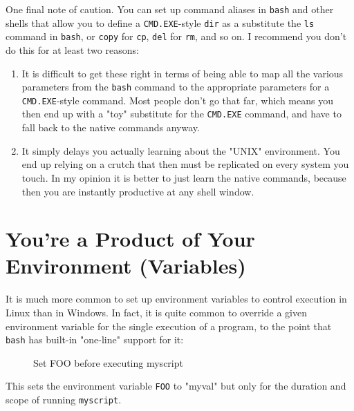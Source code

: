 \documentclass[10pt,american,]{book}
\newenvironment{Shaded}{\begin{snugshade}}{\end{snugshade}}
\newcommand{\KeywordTok}[1]{\textcolor[rgb]{0.13,0.29,0.53}{\textbf{{#1}}}}
\newcommand{\OtherTok}[1]{\textcolor[rgb]{0.56,0.35,0.01}{{#1}}}
\newcommand{\NormalTok}[1]{{#1}}
\numberwithin{figure}{chapter}
\DeclareRobustCommand{\drcap}[1]{\begin{figure}[H]\caption{#1}\end{figure}}
\renewcommand{\KeywordTok}[1]{{#1}}
\renewcommand{\OtherTok}[1]{{#1}}
\renewcommand{\NormalTok}[1]{{#1}}
\begin{document}
One final note of caution. You can set up command aliases in
\texttt{bash} and other shells that allow you to define a
\texttt{CMD.EXE}-style \texttt{dir} as a substitute the \texttt{ls}
command in \texttt{bash}, or \texttt{copy} for \texttt{cp}, \texttt{del}
for \texttt{rm}, and so on. I recommend you don't do this for at least
two reasons:

\begin{enumerate}
\def\labelenumi{\arabic{enumi}.}
\item
  It is difficult to get these right in terms of being able to map all
  the various parameters from the \texttt{bash} command to the
  appropriate parameters for a \texttt{CMD.EXE}-style command. Most
  people don't go that far, which means you then end up with a "toy"
  substitute for the \texttt{CMD.EXE} command, and have to fall back to
  the native commands anyway.
\item
  It simply delays you actually learning about the "UNIX" environment.
  You end up relying on a crutch that then must be replicated on every
  system you touch. In my opinion it is better to just learn the native
  commands, because then you are instantly productive at any shell
  window.
\end{enumerate}

\section*{You're a Product of Your Environment
(Variables)}\label{youre-a-product-of-your-environment-variables}

It is much more common to set up environment variables to control
execution in Linux than in Windows. In fact, it is quite common to
override a given environment variable for the single execution of a
program, to the point that \texttt{bash} has built-in "one-line" support
for it:

\drcap{Set FOO before executing myscript}

\begin{Shaded}
\end{Shaded}

This sets the environment variable \texttt{FOO} to "myval" but only for
the duration and scope of running \texttt{myscript}.
\end{document}
